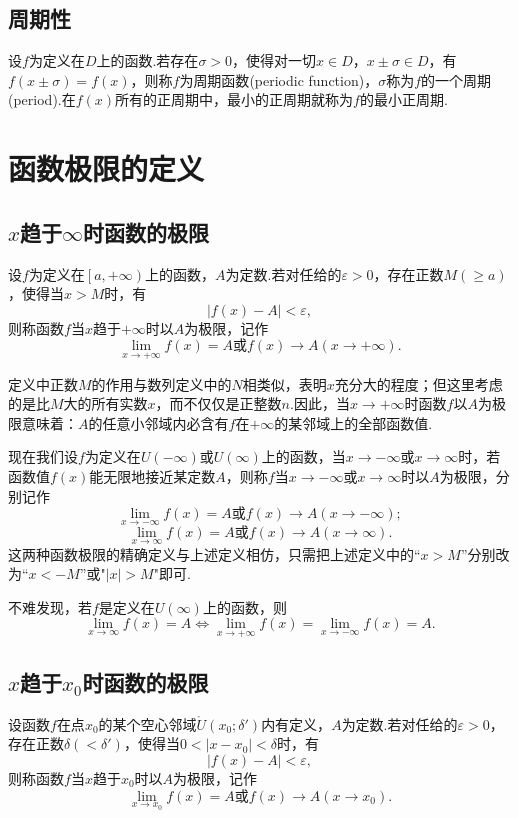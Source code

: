 \subsection{周期性}
\begin{definition}[周期函数]
	设$f$为定义在$D$上的函数.若存在$\sigma>0$，使得对一切$x\in D$，$x\pm \sigma\in D$，有$f(x\pm\sigma)=f(x)$，则称$f$为{\heiti 周期函数}(periodic function)，$\sigma$称为$f$的一个{\heiti 周期}(period).在$f(x)$所有的正周期中，最小的正周期就称为$f$的{\heiti 最小正周期}.
\end{definition}
\section{函数极限的定义}
\subsection{$x$趋于$\infty$时函数的极限}
\begin{definition}
	设$f$为定义在$\left[a,+\infty \right)$上的函数，$A$为定数.若对任给的$\varepsilon>0$，存在正数$M(\geqslant a)$，使得当$x>M$时，有
	$$|f(x)-A|<\varepsilon,$$
	则称{\heiti 函数$f$当$x$趋于$+\infty$时以$A$为极限}，记作
	$$\lim\limits_{x\to +\infty}f(x)=A\text{或}f(x)\to A(x\to +\infty).$$
\end{definition}
定义中正数$M$的作用与数列定义中的$N$相类似，表明$x$充分大的程度；但这里考虑的是比$M$大的所有实数$x$，而不仅仅是正整数$n$.因此，当$x\to +\infty$时函数$f$以$A$为极限意味着：$A$的任意小邻域内必含有$f$在$+\infty$的某邻域上的全部函数值.

现在我们设$f$为定义在$U(-\infty)$或$U(\infty)$上的函数，当$x\to -\infty$或$x\to\infty$时，若函数值$f(x)$能无限地接近某定数$A$，则称$f$当$x\to -\infty$或$x\to\infty$时以$A$为极限，分别记作
$$\lim\limits_{x\to -\infty}f(x)=A\text{或}f(x)\to A(x\to -\infty);$$
$$\lim\limits_{x\to \infty}f(x)=A\text{或}f(x)\to A(x\to \infty).$$
这两种函数极限的精确定义与上述定义相仿，只需把上述定义中的“$x>M$”分别改为“$x<-M$”或"$|x|>M$"即可.

不难发现，若$f$是定义在$U(\infty)$上的函数，则
$$\lim\limits_{x\to\infty}f(x)=A\iff \lim\limits_{x\to +\infty}f(x)=\lim\limits_{x\to -\infty}f(x)=A.$$
\subsection{$x$趋于$x_0$时函数的极限}
\begin{definition}
	设函数$f$在点$x_0$的某个空心邻域$\mathring{U}(x_0;\delta')$内有定义，$A$为定数.若对任给的$\varepsilon>0$，存在正数$\delta(<\delta')$，使得当$0<|x-x_0|<\delta$时，有
	$$|f(x)-A|<\varepsilon,$$
	则称{\heiti 函数$f$当$x$趋于$x_0$时以$A$为极限}，记作
	$$\lim\limits_{x\to x_0}f(x)=A\text{或}f(x)\to A(x\to x_0).$$
\end{definition}
